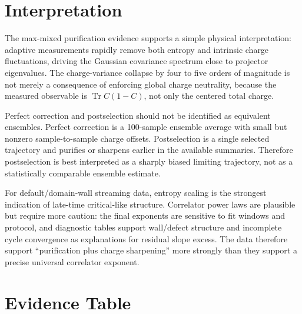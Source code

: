 \documentclass[aps,prb,onecolumn,nofootinbib,superscriptaddress]{revtex4-2}
\begin{document}
\section{Interpretation}

The max-mixed purification evidence supports a simple physical interpretation: adaptive measurements rapidly remove both entropy and intrinsic charge fluctuations, driving the Gaussian covariance spectrum close to projector eigenvalues.  The charge-variance collapse by four to five orders of magnitude is not merely a consequence of enforcing global charge neutrality, because the measured observable is $\operatorname{Tr} C(1-C)$, not only the centered total charge.

Perfect correction and postselection should not be identified as equivalent ensembles.  Perfect correction is a 100-sample ensemble average with small but nonzero sample-to-sample charge offsets.  Postselection is a single selected trajectory and purifies or sharpens earlier in the available summaries.  Therefore postselection is best interpreted as a sharply biased limiting trajectory, not as a statistically comparable ensemble estimate.

For default/domain-wall streaming data, entropy scaling is the strongest indication of late-time critical-like structure.  Correlator power laws are plausible but require more caution: the final exponents are sensitive to fit windows and protocol, and diagnostic tables support wall/defect structure and incomplete cycle convergence as explanations for residual slope excess.  The data therefore support ``purification plus charge sharpening'' more strongly than they support a precise universal correlator exponent.

\section{Evidence Table}
\end{document}
